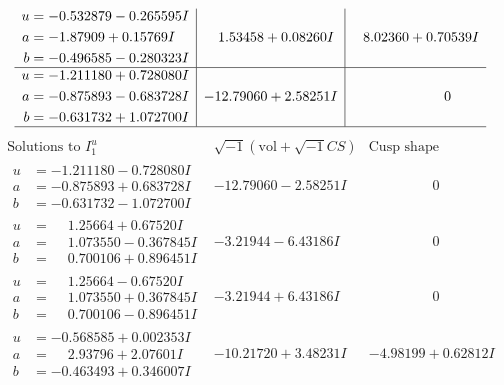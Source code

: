 \documentclass[1p]{elsarticle_modified}
\theoremstyle{definition}
\newcommand{\I}{\sqrt{-1}}
\begin{document}
$$\begin{array}{c|c|c}
\begin{aligned}
u &= -0.532879 - 0.265595 I \\
a &= -1.87909 + 0.15769 I \\
b &= -0.496585 - 0.280323 I\end{aligned}
 & \phantom{-}1.53458 + 0.08260 I & \phantom{-}8.02360 + 0.70539 I \\ \hline\begin{aligned}
u &= -1.211180 + 0.728080 I \\
a &= -0.875893 - 0.683728 I \\
b &= -0.631732 + 1.072700 I\end{aligned}
 & -12.79060 + 2.58251 I & \phantom{-0.000000 } 0\\
 \hline 
 \end{array}$$\newpage$$\begin{array}{c|c|c}  
\text{Solutions to }I^u_{1}& \I (\text{vol} + \sqrt{-1}CS) & \text{Cusp shape}\\
 \hline 
\begin{aligned}
u &= -1.211180 - 0.728080 I \\
a &= -0.875893 + 0.683728 I \\
b &= -0.631732 - 1.072700 I\end{aligned}
 & -12.79060 - 2.58251 I & \phantom{-0.000000 } 0 \\ \hline\begin{aligned}
u &= \phantom{-}1.25664 + 0.67520 I \\
a &= \phantom{-}1.073550 - 0.367845 I \\
b &= \phantom{-}0.700106 + 0.896451 I\end{aligned}
 & -3.21944 - 6.43186 I & \phantom{-0.000000 } 0 \\ \hline\begin{aligned}
u &= \phantom{-}1.25664 - 0.67520 I \\
a &= \phantom{-}1.073550 + 0.367845 I \\
b &= \phantom{-}0.700106 - 0.896451 I\end{aligned}
 & -3.21944 + 6.43186 I & \phantom{-0.000000 } 0 \\ \hline\begin{aligned}
u &= -0.568585 + 0.002353 I \\
a &= \phantom{-}2.93796 + 2.07601 I \\
b &= -0.463493 + 0.346007 I\end{aligned}
 & -10.21720 + 3.48231 I & -4.98199 + 0.62812 I \\ \hline\begin{aligned}

\end{aligned}
\end{array}$$
\end{document}
